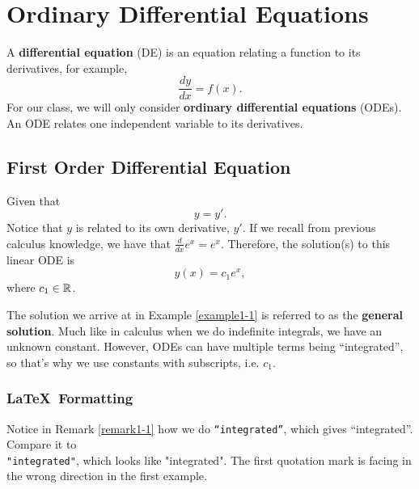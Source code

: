 \documentclass[../template.tex]{subfiles}
\begin{document}
    \chapter{Ordinary Differential Equations}

    \begin{definition}
        A \textbf{differential equation} (DE) is an equation relating a function to its derivatives, for example,
        \[
            \frac{dy}{dx} = f(x).
        \]
        For our class, we will only consider \textbf{ordinary differential equations} (ODEs). An ODE relates one independent variable to its derivatives.
    \end{definition}

    \section{First Order Differential Equation}

    \begin{example}
        Given that
        \[
            y = y'.
        \]
        Notice that $y$ is related to its own derivative, $y'$. If we recall from previous calculus knowledge, we have that $\frac{d}{dx}e^x = e^x$. Therefore, the solution(s) to this linear ODE is
        \[
            y(x) = c_1e^x,
        \]
        where $c_1 \in \mathbb{R}$.
    \end{example}

    \begin{remark}[]
        The solution we arrive at in Example \ref{example1-1} is referred to as the \textbf{general solution}. Much like in calculus when we do indefinite integrals, we have an unknown constant. 
        However, ODEs can have multiple terms being ``integrated'', so that's why we use constants with subscripts, i.e. $c_1$.
    \end{remark}
    \np %
    \subsection{\LaTeX\ Formatting}
    Notice in Remark \ref{remark1-1} how we do \texttt{``integrated''}, which gives ``integrated''. Compare it to\\\texttt{"integrated"}, which looks like "integrated". The first quotation mark is facing in the wrong direction in the first example.
\end{document}
